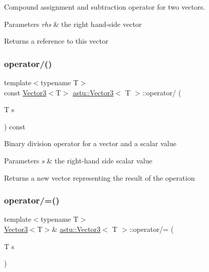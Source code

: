 Compound assignment and subtraction operator for two vectors.


\begin{DoxyParams}{Parameters}
{\em rhs} & the right hand-\/side vector \\
\hline
\end{DoxyParams}
\begin{DoxyReturn}{Returns}
a reference to this vector 
\end{DoxyReturn}
\mbox{\label{classastu_1_1Vector3_a6c36c85f2345591b119f7697d2382fbc}} 
\subsubsection{\texorpdfstring{operator/()}{operator/()}}
{\footnotesize\ttfamily template$<$typename T$>$ \\
const \hyperlink{classastu_1_1Vector3}{Vector3}$<$T$>$ \hyperlink{classastu_1_1Vector3}{astu\+::\+Vector3}$<$ T $>$\+::operator/ (\begin{DoxyParamCaption}\item[{T}]{s }\end{DoxyParamCaption}) const\hspace{0.3cm}{\ttfamily [inline]}}

Binary division operator for a vector and a scalar value


\begin{DoxyParams}{Parameters}
{\em s} & the right-\/hand side scalar value \\
\hline
\end{DoxyParams}
\begin{DoxyReturn}{Returns}
a new vector representing the result of the operation 
\end{DoxyReturn}
\mbox{\label{classastu_1_1Vector3_a858693a6f564e9d359db60f04d497d28}} 
\subsubsection{\texorpdfstring{operator/=()}{operator/=()}}
{\footnotesize\ttfamily template$<$typename T$>$ \\
\hyperlink{classastu_1_1Vector3}{Vector3}$<$T$>$\& \hyperlink{classastu_1_1Vector3}{astu\+::\+Vector3}$<$ T $>$\+::operator/= (\begin{DoxyParamCaption}\item[{T}]{s }\end{DoxyParamCaption})\hspace{0.3cm}{\ttfamily [inline]}}

